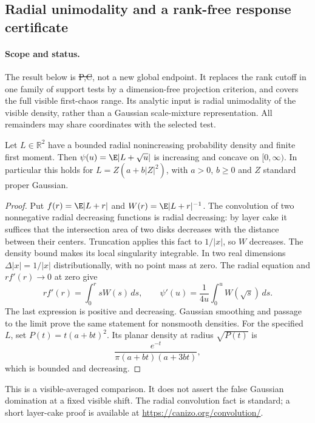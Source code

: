 \subsection{Radial unimodality and a rank-free response certificate}
\label{sec:conditional-response-contact-20261022}

\paragraph{Scope and status.}
The result below is \st{P,C}, not a new global endpoint.
It replaces the rank cutoff in one family of support tests by a
dimension-free projection criterion, and covers the full visible
first-chaos range. Its analytic input is radial unimodality of the
visible density, rather than a Gaussian scale-mixture representation.
All remainders may share coordinates with the selected test.

\begin{lemma}
\label{lem:radial-visible-concavity}
Let $L\in\mathbb R^2$ have a bounded radial nonincreasing probability
density and finite first moment. Then
$\psi(u)=\E|L+\sqrt u|$ is increasing and concave on $[0,\infty)$.
In particular this holds for
$L=Z(a+b|Z|^2)$, with $a>0$, $b\ge0$ and $Z$ standard proper Gaussian.
\end{lemma}
\begin{proof}
Put $f(r)=\E|L+r|$ and $W(r)=\E|L+r|^{-1}$.
The convolution of two nonnegative radial decreasing functions is
radial decreasing: by layer cake it suffices that the intersection
area of two disks decreases with the distance between their centers.
Truncation applies this fact to $1/|x|$, so $W$ decreases.
The density bound makes its local singularity integrable.
In two real dimensions $\Delta|x|=1/|x|$ distributionally, with no
point mass at zero. The radial equation and $rf'(r)\to0$ at zero give
\[
 rf'(r)=\int_0^r sW(s)\,ds,\qquad
 \psi'(u)=\frac1{4u}\int_0^u W(\sqrt s)\,ds.
\]
The last expression is positive and decreasing. Gaussian smoothing
and passage to the limit prove the same statement for nonsmooth
densities. For the specified $L$, set $P(t)=t(a+bt)^2$. Its planar
density at radius $\sqrt{P(t)}$ is
\[
 \frac{e^{-t}}{\pi(a+bt)(a+3bt)},
\]
which is bounded and decreasing.
\end{proof}
This is a visible-averaged comparison. It does not assert the false
Gaussian domination at a fixed visible shift. The radial convolution
fact is standard; a short layer-cake proof is available at
\url{https://canizo.org/convolution/}.

